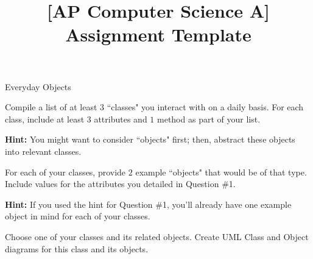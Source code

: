 \documentclass[11pt]{exam}
\title{[AP Computer Science A] Assignment Template}
\newcommand{\AssignmentTitle}{Everyday Objects}
\newcommand{\ColorQuestion}[2]{\renewcommand{\questionlabel}{\colorbox{#1}{\color{white}\bfseries\thequestion}\hfill}\question #2}
\newcommand{\YellowQuestion}[1]{\ColorQuestion{Goldenrod}{#1}}
\begin{document}
	\begin{center}
		\Large\AssignmentTitle
	\end{center}

	\begin{questions}
		\YellowQuestion Compile a list of at least $3$ ``classes" you interact with on a daily basis. For each class, include at least $3$ attributes and $1$ method as part of your list.

        {\small\textbf{Hint:} You might want to consider ``objects" first; then, abstract these objects into relevant classes.}

        \vspace{1cm}

        \YellowQuestion For each of your classes, provide $2$ example ``objects" that would be of that type. Include values for the attributes you detailed in Question \#1.

        {\small\textbf{Hint:} If you used the hint for Question \#1, you'll already have one example object in mind for each of your classes.}
        
        \vspace{1cm}

        \YellowQuestion Choose one of your classes and its related objects. Create UML Class and Object diagrams for this class and its objects.
	\end{questions}
\end{document}
